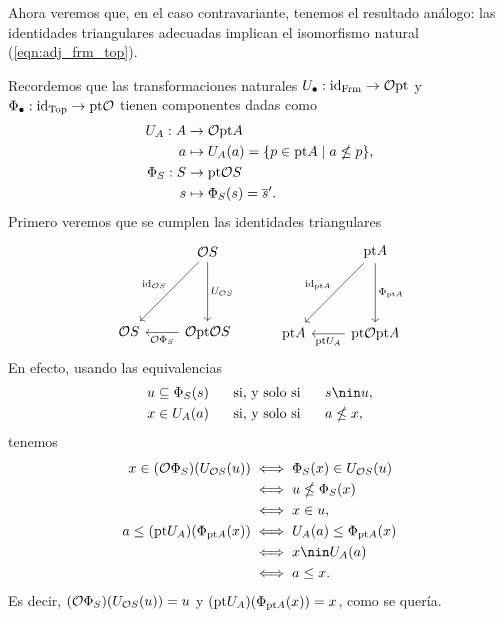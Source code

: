 Ahora veremos que, en el caso contravariante,
tenemos el resultado análogo:
las identidades triangulares adecuadas
implican el isomorfismo natural (\ref{eqn:adj_frm_top}).

Recordemos que las transformaciones naturales
$U_\bullet:\id_\Frm\to\cal O\pt$ y
$\Phi_\bullet:\id_\Top\to\pt\cal O$
tienen componentes dadas como
\begin{align*}
    U_A:A&\to \cal O\pt A \\
    a &\mapsto U_A(a) = \{p\in \pt A \mid a\nleq p\}, \\
    \Phi_S:S&\to \pt\cal O S \\
    s &\mapsto \Phi_S(s)=\ol{s}'.
\end{align*}
Primero veremos que se cumplen las identidades triangulares
\[
    \begin{tikzcd}[row sep=15mm]
        & \cal OS \ar[d,"U_{\cal OS}"] \ar[dl,"\id_{\cal OS}"']
        \\
        \cal OS
        & \cal O\pt\cal OS \ar[l,"\cal O\Phi_S"]
    \end{tikzcd}
    \hspace{10mm}
    \begin{tikzcd}[row sep=15mm]
        & \pt A \ar[d,"\Phi_{\pt A}"] \ar[dl,"\id_{\pt A}"']
        \\
        \pt A
        & \pt \cal O\pt A \ar[l,"\pt U_A"]
    \end{tikzcd}
\]
En efecto, usando las equivalencias
\begin{align*}
    u\subseteq \Phi_S(s) &\ssi s\nin u, \\
    x\in U_A(a) &\ssi a\nleq x,
\end{align*}
tenemos
\begin{align*}
    x\in (\cal O\Phi_S)(U_{\cal OS}(u))
    &\iff \Phi_S(x) \in U_{\cal OS}(u) \\
    &\iff u\nleq \Phi_S(x) \\
    &\iff x\in u,
    \\
    a\leq (\pt U_A)(\Phi_{\pt A}(x))
    &\iff U_A(a) \leq \Phi_{\pt A}(x) \\
    &\iff x\nin U_A(a) \\
    &\iff a\leq x.
\end{align*}
Es decir, $(\cal O\Phi_S)(U_{\cal OS}(u))=u$
y $(\pt U_A)(\Phi_{\pt A}(x))=x$, como se quería.

